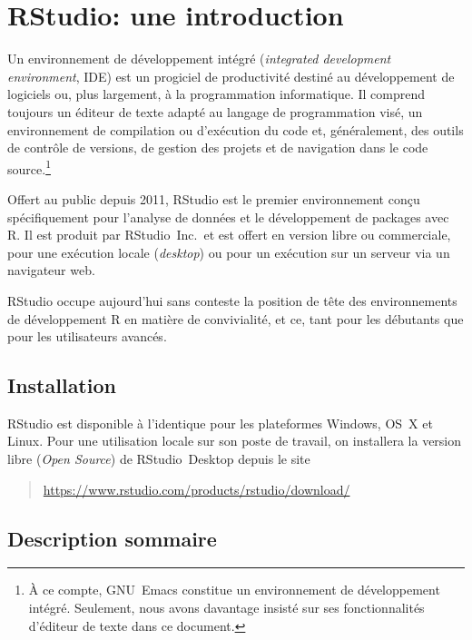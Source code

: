 \chapter{RStudio: une introduction}
\label{rstudio}

Un environnement de développement intégré (\emph{integrated
  development environment}, IDE) est un progiciel de productivité
destiné au développement de logiciels ou, plus largement, à la
programmation informatique. Il comprend toujours un éditeur de texte
adapté au langage de programmation visé, un environnement de
compilation ou d'exécution du code et, généralement, des outils de
contrôle de versions, de gestion des projets et de navigation dans le
code source.\footnote{%
  À ce compte, GNU~Emacs constitue un environnement de développement
  intégré. Seulement, nous avons davantage insisté sur ses
  fonctionnalités d'éditeur de texte dans ce document.} %

Offert au public depuis 2011, RStudio est le premier environnement
conçu spécifiquement pour l'analyse de données et le développement de
packages avec R. Il est produit par RStudio~Inc.\ et est offert en
version libre ou commerciale, pour une exécution locale
(\emph{desktop}) ou pour un exécution sur un serveur via un navigateur
web.

RStudio occupe aujourd'hui sans conteste la position de tête des
environnements de développement R en matière de convivialité, et ce,
tant pour les débutants que pour les utilisateurs avancés.


\section{Installation}
\label{rstudio:installation}

RStudio est disponible à l'identique pour les plateformes Windows,
OS~X et Linux. Pour une utilisation locale sur son poste de travail,
on installera la version libre (\emph{Open Source}) de RStudio~Desktop
depuis le site
\begin{quote}
  \url{https://www.rstudio.com/products/rstudio/download/}
\end{quote}


\section{Description sommaire}
\label{rstudio:description}

